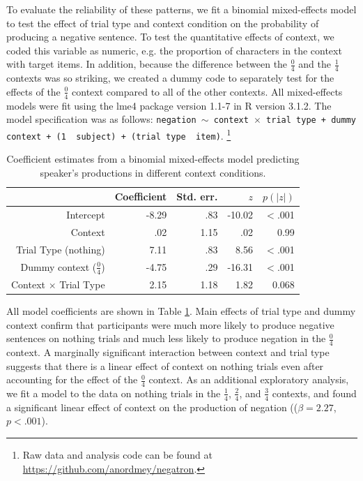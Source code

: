 \documentclass[man, noapacite]{apa2}
\begin{document}
To evaluate the reliability of these patterns, we fit a binomial mixed-effects model to test the effect of trial type and context condition on the probability of producing a negative sentence.  To test the quantitative effects of context, we coded this variable as numeric, e.g. the proportion of characters in the context with target items.  In addition, because the difference between the  $\frac{0}{4}$ and the  $\frac{1}{4}$ contexts was so striking, we created a dummy code to separately test for the effects of the  $\frac{0}{4}$ context compared to all of the other contexts.  All mixed-effects models were fit using the lme4 package version 1.1-7 in R version 3.1.2.  The model specification was as follows: \texttt{negation $\sim$ context~$\times$~trial type + dummy context + (1~\textbar~subject) +  (trial type~\textbar~item)}.  \footnote{Raw data and analysis code can be found at \url{https://github.com/anordmey/negatron}.}

\begin{table}[t]
\caption{\label{tab:speakermodel} Coefficient estimates from a binomial mixed-effects model predicting speaker's productions in different context conditions.}
\begin{center}
\begin{tabular}{rrrrr}
  \hline
 & Coefficient & Std. err. & $z$ & $p(|z|)$ \\ 
  \hline
Intercept & -8.29 & .83 & -10.02 & $<$.001 \\ 
  Context & .02 & 1.15 & .02 &  0.99 \\ 
  Trial Type (nothing) & 7.11 & .83 & 8.56 & $<$.001 \\
  Dummy context ($\frac{0}{4}$) & -4.75& .29 & -16.31 & $<$.001 \\ 
  Context $\times$ Trial Type & 2.15 & 1.18 & 1.82 & 0.068 \\
   \hline
\end{tabular}
\vspace{-1.5cm}
\end{center}
\end{table}

All model coefficients are shown in Table \ref{tab:speakermodel}.  Main effects of trial type and dummy context confirm that participants were much more likely to produce negative sentences on nothing trials and much less likely to produce negation in the $\frac{0}{4}$ context.  A marginally significant interaction between context and trial type suggests that there is a linear effect of context on nothing trials even after accounting for the effect of the $\frac{0}{4}$ context.  As an additional exploratory analysis, we fit a model to the data on nothing trials in the $\frac{1}{4}$, $\frac{2}{4}$, and $\frac{3}{4}$ contexts, and found a significant linear effect of context on the production of negation (($\beta= 2.27$, $p< .001$).  
\end{document}
